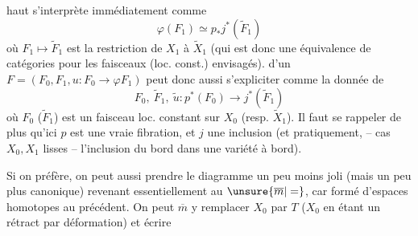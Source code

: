 %
haut s'interprète immédiatement comme
\[
\varphi(F_1)\simeq p_*j^*(\widetilde F_1)
\]
où $F_1\mapsto\widetilde F_1$ est la restriction de $X_1$ à $\widetilde X_1$ (qui est donc une équivalence de catégories pour les faisceaux (loc. const.) envisagés).   d'un $F=(F_0,F_1,u:F_0\to\varphi F_1)$ peut donc aussi s'expliciter comme la donnée de
\[
F_0,\ \widetilde F_1,\ \widetilde u:p^*(F_0)\longrightarrow j^*(\widetilde F_1)
\]
où $F_0$ ($\widetilde F_1$) est un faisceau loc. constant sur $X_0$ (resp. $\widetilde X_1$). Il faut se rappeler de plus qu'ici $p$ est une vraie fibration, et $j$ une inclusion (et pratiquement, -- cas $X_0,X_1$ lisses --  l'inclusion du bord dans une variété à bord).

Si on préfère, on peut aussi prendre le diagramme un peu moins joli (mais un peu plus canonique)
revenant essentiellement au $\unsure{\overline m|=}$, car formé d'espaces homotopes au précédent. On peut $\overline m$ y remplacer $X_0$ par $T$ ($X_0$ en étant un rétract par déformation) et écrire
